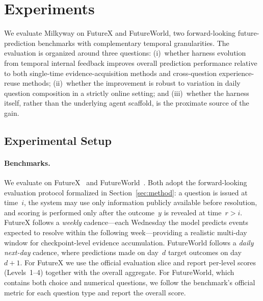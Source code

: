 
\section{Experiments}
\label{sec:experiments}

We evaluate Milkyway on FutureX and FutureWorld, two forward-looking future-prediction benchmarks with complementary temporal granularities. The evaluation is organized around three questions: (i)~whether harness evolution from temporal internal feedback improves overall prediction performance relative to both single-time evidence-acquisition methods and cross-question experience-reuse methods; (ii)~whether the improvement is robust to variation in daily question composition in a strictly online setting; and (iii)~whether the harness itself, rather than the underlying agent scaffold, is the proximate source of the gain.

\subsection{Experimental Setup}
\label{sec:exp_setup}

\paragraph{Benchmarks.}
We evaluate on FutureX~\citep{zeng2025futurex} and FutureWorld~\citep{FutureWorld2026han}. Both adopt the forward-looking evaluation protocol formalized in Section~\ref{sec:method}: a question is issued at time~$i$, the system may use only information publicly available before resolution, and scoring is performed only after the outcome~$y$ is revealed at time~$r > i$. FutureX follows a \emph{weekly} cadence---each Wednesday the model predicts events expected to resolve within the following week---providing a realistic multi-day window for checkpoint-level evidence accumulation. FutureWorld follows a \emph{daily next-day} cadence, where predictions made on day~$d$ target outcomes on day~$d+1$. For FutureX we use the official evaluation slice and report per-level scores (Levels~1--4) together with the overall aggregate. For FutureWorld, which contains both choice and numerical questions, we follow the benchmark's official metric for each question type and report the overall score.

